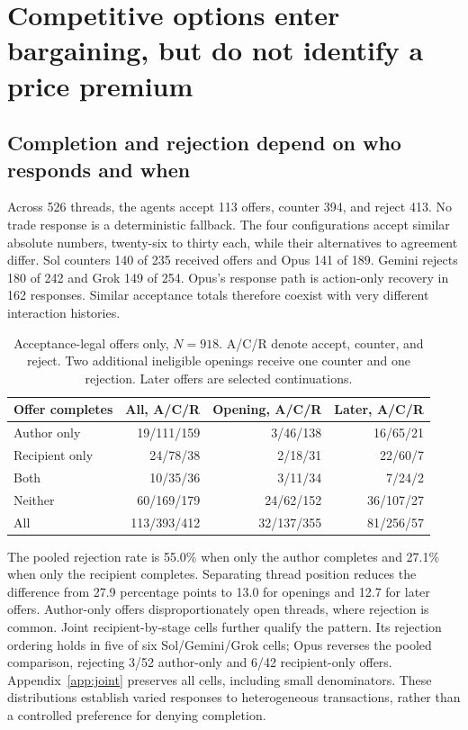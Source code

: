 \section{Competitive options enter bargaining, but do not identify a price premium}
\label{sec:bargain}

\subsection{Completion and rejection depend on who responds and when}

Across 526 threads, the agents accept 113 offers, counter 394, and reject 413. No trade response is a deterministic fallback. The four configurations accept similar absolute numbers, twenty-six to thirty each, while their alternatives to agreement differ. Sol counters 140 of 235 received offers and Opus 141 of 189. Gemini rejects 180 of 242 and Grok 149 of 254. Opus's response path is action-only recovery in 162 responses. Similar acceptance totals therefore coexist with very different interaction histories.

\begin{table}[t]
\centering\small
\begin{tabular}{@{}lrrr@{}}\toprule
Offer completes & All, A/C/R & Opening, A/C/R & Later, A/C/R\\\midrule
Author only & 19/111/159 & 3/46/138 & 16/65/21\\
Recipient only & 24/78/38 & 2/18/31 & 22/60/7\\
Both & 10/35/36 & 3/11/34 & 7/24/2\\
Neither & 60/169/179 & 24/62/152 & 36/107/27\\\midrule
All & 113/393/412 & 32/137/355 & 81/256/57\\\bottomrule
\end{tabular}
\caption{Acceptance-legal offers only, $N=918$. A/C/R denote accept, counter, and reject. Two additional ineligible openings receive one counter and one rejection. Later offers are selected continuations.}
\label{tab:responses}
\end{table}

The pooled rejection rate is 55.0\% when only the author completes and 27.1\% when only the recipient completes. Separating thread position reduces the difference from 27.9 percentage points to 13.0 for openings and 12.7 for later offers. Author-only offers disproportionately open threads, where rejection is common. Joint recipient-by-stage cells further qualify the pattern. Its rejection ordering holds in five of six Sol/Gemini/Grok cells; Opus reverses the pooled comparison, rejecting 3/52 author-only and 6/42 recipient-only offers. Appendix~\ref{app:joint} preserves all cells, including small denominators. These distributions establish varied responses to heterogeneous transactions, rather than a controlled preference for denying completion.

